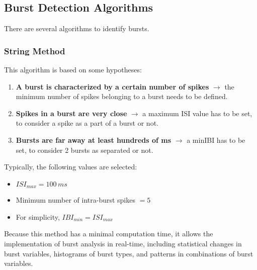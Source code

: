 \subsection{Burst Detection Algorithms}
There are several algorithms to identify bursts.
\subsubsection{String Method}
This algorithm is based on some hypotheses:
\begin{enumerate}
    \item \textbf{A burst is characterized by a certain number of spikes} \(\rightarrow\)
          the minimum number of spikes belonging to a burst needs to be defined.
    \item \textbf{Spikes in a burst are very close} \(\rightarrow\) a maximum ISI value has
          to be set, to consider a spike as a part of a burst or not.
    \item \textbf{Bursts are far away at least hundreds of ms} \(\rightarrow\) a minIBI has
          to be set, to consider 2 bursts as separated or not.
\end{enumerate}
Typically, the following values are selected:
\begin{itemize}
    \item \(ISI_{max}=100\,ms\)
    \item Minimum number of intra-burst spikes \(=5\)
    \item For simplicity, \(IBI_{min}=ISI_{max}\)
\end{itemize}
Because this method has a minimal computation time, it allows the implementation of burst
analysis in real-time, including statistical changes in burst variables, histograms of burst
types, and patterns in combinations of burst variables.
